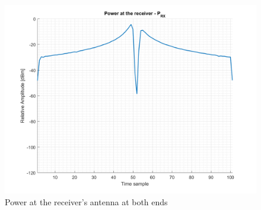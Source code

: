 \begin{figure}[H]
	\centering
	\includegraphics[scale=0.8]{figures/s3_power.png}
	\caption{Power at the receiver's antenna at both ends}
	\label{fig:s3_power}
\end{figure}